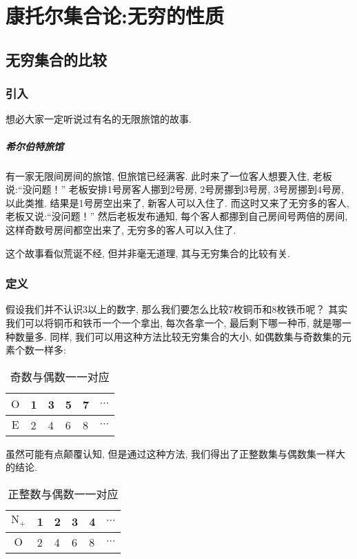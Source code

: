 \chapter{康托尔集合论:无穷的性质}

\section{无穷集合的比较}
\subsection{引入}
想必大家一定听说过有名的无限旅馆的故事.

\paragraph{希尔伯特旅馆}
有一家无限间房间的旅馆, 但旅馆已经满客.
此时来了一位客人想要入住, 老板说:“没问题！”
老板安排1号房客人挪到2号房, 2号房挪到3号房, 3号房挪到4号房, 以此类推.
结果是1号房空出来了, 新客人可以入住了.
而这时又来了无穷多的客人, 老板又说:“没问题！”
然后老板发布通知, 每个客人都挪到自己房间号两倍的房间, 这样奇数号房间都空出来了, 无穷多的客人可以入住了.

这个故事看似荒诞不经, 但并非毫无道理, 其与无穷集合的比较有关.

\subsection{定义}
\label{defi}
假设我们并不认识$3$以上的数字, 那么我们要怎么比较$7$枚铜币和$8$枚铁币呢？
其实我们可以将铜币和铁币一个一个拿出, 每次各拿一个, 最后剩下哪一种币, 就是哪一种数量多.
同样, 我们可以用这种方法比较无穷集合的大小, 如偶数集与奇数集的元素个数一样多:
\begin{table}[!ht]
  \centering
    \begin{tabular}{c|lllll}
      \toprule
      $\mathrm O$ & 1 & 3 & 5 & 7 & $\cdots$ \\
      \midrule
      $\mathrm E$ & 2 & 4 & 6 & 8 & $\cdots$ \\
      \bottomrule
    \end{tabular}
    \caption{奇数与偶数一一对应}
\end{table}

虽然可能有点颠覆认知, 但是通过这种方法, 我们得出了正整数集与偶数集一样大的结论.

\begin{table}[!h]
  \centering
    \begin{tabular}{c|lllll}
      \toprule
      $\mathrm N_+$ & 1 & 2 & 3 & 4 & $\cdots$ \\
      \midrule
      $\mathrm O$   & 2 & 4 & 6 & 8 & $\cdots$ \\
      \bottomrule
    \end{tabular}
    \caption{正整数与偶数一一对应}
\end{table}

